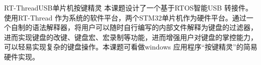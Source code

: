 


\begin{Cabstract}{RT-Thread}{USB}{单片机}{按键精灵}{}
本课题设计了一个基于RTOS智能USB 转接件。使用RT-Thread 作为系统的软件平台，两个STM32单片机作为硬件平台。通过一个自制的语法解释器，将用户可以随时自行编写的内部文件解释为键盘的过滤器，进而实现键盘的改键、键盘宏、宏录制等功能，进而增强用户对键盘的掌控能力，可以轻易实现复杂的键盘操作。本课题可看做windows 应用程序“按键精灵”的简易硬件实现。
\end{Cabstract}
